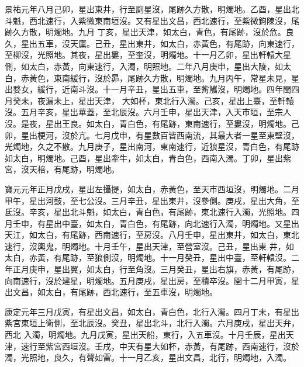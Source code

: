 \begin{pinyinscope}
 景祐元年八月己卯，星出東井，行至廁星沒，尾跡久方散，明燭地。乙酉，星出北斗魁，西北速行，入紫微東南垣沒。又有星出文昌，西北速行，至紫微鉤陳沒，尾跡久方散，明燭地。九月
 丁亥，星出天津，如太白，青色，有尾跡，沒於危。良久，星出五車，沒天廩。己丑，星出東井，如太白，赤黃色，有尾跡，向東速行，至柳沒，光照地。其夜，星出婁，至奎沒，明燭地。十一月乙卯，星出軒轅大星側，如太白，赤黃，向東速行，入濁，明照地。二年八月庚申，星出大陵，如太白，赤黃色，東南緩行，沒於昴，尾跡久方散，明燭地。九月丙午，常星未見，星出婺女，緩行，近南斗沒。十一月辛丑，星出五車，至觜觿沒，明燭地。四年閏四月癸未，夜漏未上，星出天津，
 大如杯，東北行入濁。己亥，星出上臺，至軒轅沒。五月辛亥，星出華蓋，至北辰沒。六月壬申，星出天津，入天市垣，至宗人沒。是夜，星出王良。如太白，青白色，有尾跡，東南速行，至婁沒，明燭地。己卯，星出梗河，沒於亢。七月戊申，有星數百皆西南流，其最大者一星至東壁沒，光燭地，久之不散。九月庚子，星出南河，東南速行，近狼星沒，青白色，有尾跡如太白，明燭地。己酉，星出牽牛，如太白，青白色，西南入濁。丁卯，星出紫宮，沒天棓，有尾跡，明燭地。



 寶元元年正月戊戌，星出左攝提，如太白，赤黃色，至天市西垣沒，明燭地。二月甲午，星出河鼓，至七公沒。三月辛丑，星出東井，沒參側。庚戌，星出大角，至氐沒。辛亥，星出北斗魁，如太白，青白色，有尾跡，東北速行入濁，光照地。四月壬申，有星出中臺，如太白，青白色，有尾跡，向北速行入濁，明燭地。又星出天江，如太白，有尾跡，西南速行，至房沒。八月壬申，星出東井，如太白，東北速行，沒輿鬼，明燭地。十月壬午，星出天津，至營室沒。己丑，星出東
 井，如太白，赤黃，有尾跡，至狼側沒，明燭地。十一月癸丑，星出中臺，至軒轅沒。二年正月庚申，星出翼，如太白，行至角沒。三月癸丑，星出右旗，赤黃，有尾跡，向南速行，沒於建星，明燭地。五月庚戌，星出房，至積卒沒。閏十二月甲寅，星出文昌，如太白，有尾跡，西北速行，至五車沒，明燭地。



 康定元年三月戊寅，有星出文昌，如太白，青白色，北行入濁。四月丁未，有星出紫宮東垣上衛側，至北辰沒。癸丑，星出北斗，北行入濁。六月庚戌，星出天弁，西北
 入濁，明燭地。九月戊寅，星出天船，東行，入五車沒。十月壬辰，星出天津，速行至紫宮西垣沒。壬戌，中天有星大如杯，赤黃，有尾跡，西南速行，沒於濁，光照地，良久，有聲如雷。十一月乙亥，星出文昌，北行，明燭地，入濁。




\end{pinyinscope}
